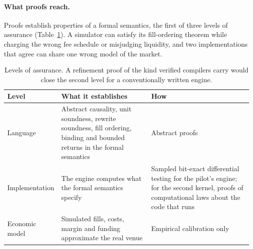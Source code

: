 \documentclass[11pt]{article}
\begin{document}
\paragraph{What proofs reach.} Proofs establish properties of a formal semantics, the first of three levels of assurance (Table~\ref{tab:assurance}). A simulator can satisfy its fill-ordering theorem while charging the wrong fee schedule or misjudging liquidity, and two implementations that agree can share one wrong model of the market.

\begin{table}[ht]
\centering
\small
\begin{tabularx}{\textwidth}{@{}>{\raggedright\arraybackslash}p{2.6cm}>{\raggedright\arraybackslash}X>{\raggedright\arraybackslash}p{4.6cm}@{}}
\toprule
Level & What it establishes & How \\
\midrule
Language & Abstract causality, unit soundness, rewrite soundness, fill ordering, binding and bounded returns in the formal semantics & Abstract proofs \\
Implementation & The engine computes what the formal semantics specify & Sampled bit-exact differential testing for the pilot's engine; for the second kernel, proofs of computational laws about the code that runs \\
Economic model & Simulated fills, costs, margin and funding approximate the real venue & Empirical calibration only \\
\bottomrule
\end{tabularx}
\caption{Levels of assurance. A refinement proof of the kind verified compilers carry \cite{leroy2009} would close the second level for a conventionally written engine.}
\label{tab:assurance}
\end{table}
\end{document}
